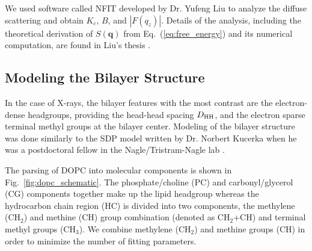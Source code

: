 We used software called NFIT developed by Dr. Yufeng Liu
\cite{Lyatskaya01,Liu04,Liu03} to analyze the diffuse scattering and
obtain $K_c$, $B$, and $|F(q_z)|$. 
Details of the analysis, including the theoretical derivation of
$S(\mathbf{q})$ from Eq.~(\ref{eq:free_energy}) and its
numerical computation, are found in Liu's thesis 
\cite{Liu03}. 

\subsection{Modeling the Bilayer Structure}\label{sec:SDP_method}
In the case of X-rays, the bilayer features with the most contrast are the 
electron-dense headgroups, providing the head-head spacing $D_\textrm{HH}$,
and the electron sparse terminal methyl groups at the bilayer center.
Modeling of the bilayer structure was done similarly to the SDP model 
written by Dr. Norbert Kucerka when he was a postdoctoral fellow in the 
Nagle/Tristram-Nagle lab \cite{Kucerka08}. 

The parsing of DOPC into molecular components is shown in
Fig.~\ref{fig:dopc_schematic}. The phosphate/choline (PC) and 
carbonyl/glycerol (CG) components together make up the lipid headgroup
whereas the hydrocarbon chain region (HC)
is divided into two components, the methylene (CH$_2$) and methine (CH) group
combination (denoted as CH$_2$+CH) and terminal methyl groups (CH$_3$). 
We combine methylene (CH$_2$) and methine groups (CH) in order to 
minimize the number of fitting parameters.

